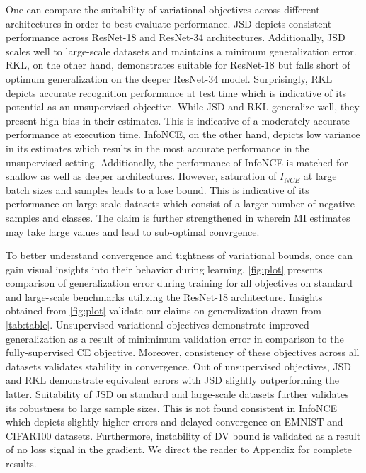 \documentclass{article}
\begin{document}
One can compare the suitability of variational objectives across different architectures in order to best evaluate performance. JSD depicts consistent performance across ResNet-18 and ResNet-34 architectures. Additionally, JSD scales well to large-scale datasets and maintains a minimum generalization error. RKL, on the other hand, demonstrates suitable for ResNet-18 but falls short of optimum generalization on the deeper ResNet-34 model. Surprisingly, RKL depicts accurate recognition performance at test time which is indicative of its potential as an unsupervised objective. While JSD and RKL generalize well, they present high bias in their estimates. This is indicative of a moderately accurate performance at execution time. InfoNCE, on the other hand, depicts low variance in its estimates which results in the most accurate performance in the unsupervised setting. Additionally, the performance of InfoNCE is matched for shallow as well as deeper architectures. However, saturation of $I_{NCE}$ at large batch sizes and samples leads to a lose bound. This is indicative of its performance on large-scale datasets which consist of a larger number of negative samples and classes. The claim is further strengthened in \cite{variational} wherein MI estimates may take large values and lead to sub-optimal convrgence. 

To better understand convergence and tightness of variational bounds, once can gain visual insights into their behavior during learning. \autoref{fig:plot} presents comparison of generalization error during training for all objectives on standard and large-scale benchmarks utilizing the ResNet-18 architecture. Insights obtained from \autoref{fig:plot} validate our claims on generalization drawn from \autoref{tab:table}. Unsupervised variational objectives demonstrate improved generalization as a result of minimimum validation error in comparison to the fully-supervised CE objective. Moreover, consistency of these objectives across all datasets validates stability in convergence. Out of unsupervised objectives, JSD and RKL demonstrate equivalent errors with JSD slightly outperforming the latter. Suitability of JSD on standard and large-scale datasets further validates its robustness to large sample sizes. This is not found consistent in InfoNCE which depicts slightly higher errors and delayed convergence on EMNIST and CIFAR100 datasets. Furthermore, instability of DV bound is validated as a result of no loss signal in the gradient. We direct the reader to Appendix for complete results.  
\end{document}
